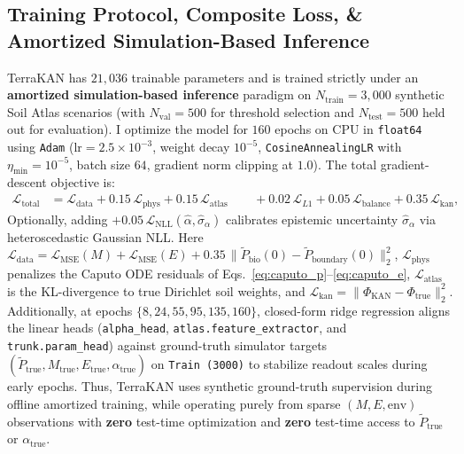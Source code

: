 \documentclass[10pt,twocolumn,a4paper]{article}
\begin{document}
\subsection{Training Protocol, Composite Loss, \& Amortized Simulation-Based Inference}

TerraKAN has $21,036$ trainable parameters and is trained strictly under an \textbf{amortized simulation-based inference} paradigm on $N_{\text{train}} = 3,000$ synthetic Soil Atlas scenarios (with $N_{\text{val}} = 500$ for threshold selection and $N_{\text{test}} = 500$ held out for evaluation). I optimize the model for $160$ epochs on CPU in \texttt{float64} using \texttt{Adam} ($\text{lr} = 2.5\times 10^{-3}$, weight decay $10^{-5}$, \texttt{CosineAnnealingLR} with $\eta_{\min} = 10^{-5}$, batch size $64$, gradient norm clipping at $1.0$). The total gradient-descent objective is:
\begin{equation}
  \begin{aligned}
    \mathcal{L}_{\text{total}} &= \mathcal{L}_{\text{data}} + 0.15\,\mathcal{L}_{\text{phys}} + 0.15\,\mathcal{L}_{\text{atlas}} \
    &\quad + 0.02\,\mathcal{L}_{L1} + 0.05\,\mathcal{L}_{\text{balance}} + 0.35\,\mathcal{L}_{\text{kan}},
  \end{aligned} \label{eq:ltotal}
\end{equation}
Optionally, adding $+0.05\,\mathcal{L}_{\text{NLL}}(\hat{\alpha}, \hat{\sigma}_\alpha)$ calibrates epistemic uncertainty $\hat{\sigma}_\alpha$ via heteroscedastic Gaussian NLL. Here $\mathcal{L}_{\text{data}} = \mathcal{L}_{\text{MSE}}(M) + \mathcal{L}_{\text{MSE}}(E) + 0.35\,\|\tilde{P}_{\text{bio}}(0) - \tilde{P}_{\text{boundary}}(0)\|_2^2$, $\mathcal{L}_{\text{phys}}$ penalizes the Caputo ODE residuals of Eqs.~\eqref{eq:caputo_p}--\eqref{eq:caputo_e}, $\mathcal{L}_{\text{atlas}}$ is the KL-divergence to true Dirichlet soil weights, and $\mathcal{L}_{\text{kan}} = \|\Phi_{\text{KAN}} - \Phi_{\text{true}}\|_2^2$. Additionally, at epochs $\{8, 24, 55, 95, 135, 160\}$, closed-form ridge regression aligns the linear heads (\texttt{alpha\_head}, \texttt{atlas.feature\_extractor}, and \texttt{trunk.param\_head}) against ground-truth simulator targets $(\tilde{P}_{\text{true}}, M_{\text{true}}, E_{\text{true}}, \alpha_{\text{true}})$ on \texttt{Train (3000)} to stabilize readout scales during early epochs. Thus, TerraKAN uses synthetic ground-truth supervision during offline amortized training, while operating purely from sparse $(M, E, \text{env})$ observations with \textbf{zero} test-time optimization and \textbf{zero} test-time access to $\tilde{P}_{\text{true}}$ or $\alpha_{\text{true}}$.
\end{document}
